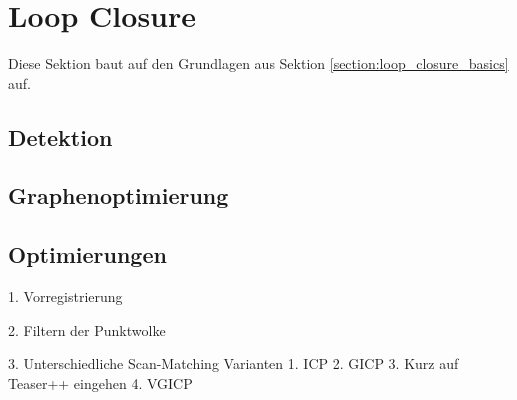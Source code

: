 \chapter{Loop Closure}

Diese Sektion baut auf den Grundlagen aus Sektion \ref{section:loop_closure_basics} auf.

\section{Detektion}

\section{Graphenoptimierung}

\section{Optimierungen}

1. Vorregistrierung

2. Filtern der Punktwolke

3. Unterschiedliche Scan-Matching Varianten
	1. ICP
	2. GICP
	3. Kurz auf Teaser++ eingehen
	4. VGICP

